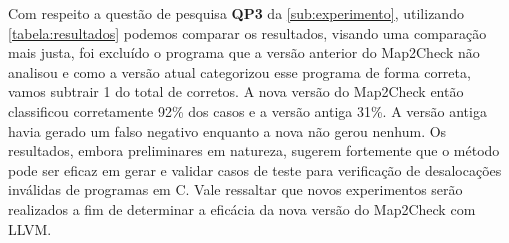 \par
Com respeito  a questão de pesquisa \textbf{QP3} da \autoref{sub:experimento}, utilizando \autoref{tabela:resultados} podemos comparar os resultados, visando uma comparação mais justa, foi excluído o programa que a versão anterior do Map2Check não analisou e como a versão atual categorizou esse programa de forma correta, vamos subtrair 1 do total de corretos. A nova versão do Map2Check então classificou corretamente 92\% dos casos e a versão antiga 31\%. A versão antiga havia gerado um falso negativo enquanto a nova não gerou nenhum.
Os resultados, embora preliminares em natureza, sugerem fortemente que o método pode ser eficaz em gerar e validar casos de teste para verificação de desalocações inválidas de programas em C. Vale ressaltar que novos experimentos serão realizados a fim de determinar a eficácia da nova versão do Map2Check com LLVM.

